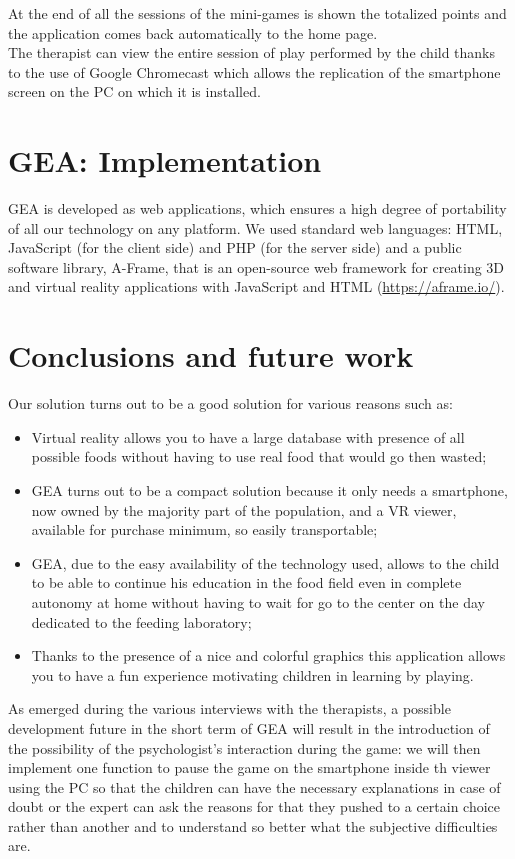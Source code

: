 \documentclass{sigchi-ext}
\begin{document}
\medskip
At the end of all the sessions of the mini-games is shown the totalized points and the application comes back automatically to the home page.\\
\medskip
The therapist can view the entire session of play performed by the child thanks to the use of Google Chromecast which allows the replication of the smartphone screen on the PC on which it is installed.


\section{GEA: Implementation}
GEA is developed as web applications, which ensures a high degree of portability of all our technology on any platform. We used standard web languages: HTML, JavaScript (for the client side) and PHP (for the server side) and a public software library, A-Frame, that is an open-source web framework for creating 3D and virtual reality applications with JavaScript and HTML (\url{https://aframe.io/}).

\section{Conclusions and future work}
Our solution turns out to be a good solution for various reasons such as:
\begin{itemize}
\item Virtual reality allows you to have a large database with presence of all possible foods without having to use real food that would go then wasted;
\item GEA turns out to be a compact solution because it only needs a smartphone, now owned by the majority
part of the population, and a VR viewer, available for purchase minimum, so easily transportable;
\item GEA, due to the easy availability of the technology used, allows to the child to be able to continue his education in the food field even in complete autonomy at home without having to wait for go to the center on the day dedicated to the feeding laboratory;
\item Thanks to the presence of a nice and colorful graphics this application allows you to have a fun experience motivating children in learning by playing.
\end{itemize}

As emerged during the various interviews with the therapists, a possible development future in the short term of GEA will result in the introduction of the possibility of the psychologist's interaction during the game: we will then implement one function to pause the game on the smartphone inside th viewer using the PC so that the children can have the necessary explanations in case of doubt or the expert can ask the reasons for that they pushed to a certain choice rather than another and to understand so better what the subjective difficulties are.\\
\end{document}
